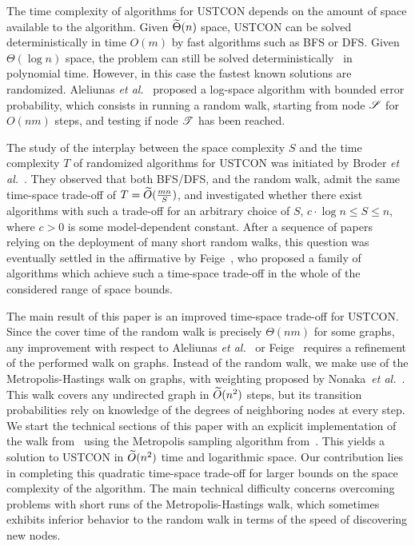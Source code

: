 \documentclass[11pt,a4paper]{article}
\newcommand{\Broder}{Broder \etal}
\newcommand{\etal}{\textsl{et al.}\xspace}
\renewcommand{\O}{\ensuremath \widetilde O}
\newcommand{\Tt}{\ensuremath \widetilde \Theta}
\newcommand{\s}{\ensuremath  \mathscr S}
\renewcommand{\t}{\ensuremath \mathscr  T}
\renewcommand{\*}{\hspace*{5mm}}
\begin{document}
The time complexity of algorithms for USTCON depends on the amount of space available to the algorithm. Given $\Tt(n)$ space, USTCON can be solved deterministically in time $O(m)$ by fast algorithms such as BFS or DFS. Given $\Theta(\log n)$ space, the problem can still be solved deterministically~\cite{Rei} in polynomial time. However, in this case the fastest known solutions are randomized. Aleliunas \etal~\cite{AKLLR} proposed a log-space algorithm with bounded error probability, which consists in running a random walk, starting from node $\s$ for $O(nm)$ steps, and testing if node $\t$ has been reached. 

The study of the interplay between the space complexity $S$ and the time complexity $T$ of randomized algorithms for USTCON was initiated by \Broder~\cite{BKRU}. They observed that both BFS/DFS, and the random walk, admit the same time-space trade-off of $T = \O (\frac{mn}{S})$, and investigated whether there exist algorithms with such a trade-off for an arbitrary choice of $S$, $c\cdot \log n \leq S \leq n$, where $c>0$ is some model-dependent constant. After a sequence of papers relying on the deployment of many short random walks, this question was eventually settled in the affirmative by Feige~\cite{F}, who proposed a family of algorithms which achieve such a time-space trade-off in the whole of the considered range of space bounds. 

The main result of this paper is an improved time-space trade-off for USTCON. Since the cover time of the random walk is precisely $\Theta(nm)$ for some graphs, any improvement with respect to Aleliunas \etal~\cite{AKLLR} or Feige~\cite{F} requires a refinement of the performed walk on graphs. Instead of the random walk, we make use of the Metropolis-Hastings walk on graphs, with weighting proposed by Nonaka~\etal~\cite{NOSY}. This walk covers any undirected graph in $\O(n^2)$ steps, but its transition probabilities rely on knowledge of the degrees of neighboring nodes at every step. We start the technical sections of this paper with an explicit implementation of the walk from~\cite{NOSY} using the Metropolis sampling algorithm from~\cite{M51}. This yields a solution to USTCON in $\O(n^2)$ time and logarithmic space. Our contribution lies in completing this quadratic time-space trade-off for larger bounds on the space complexity of the algorithm. The main technical difficulty concerns overcoming problems with short runs of the Metropolis-Hastings walk, which sometimes exhibits inferior behavior to the random walk in terms of the speed of discovering new nodes. 
\end{document}
